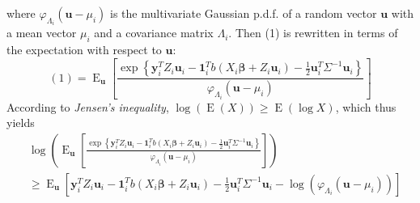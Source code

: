 \documentclass[11pt]{article}
\newcommand{\bs}{\boldsymbol}
\newcommand{\opn}{\operatorname}
\begin{document}
where $\varphi_{\Lambda_{i}} \left(\bs{u} - \mu_{i} \right)$ is the multivariate Gaussian p.d.f. of a random vector $\bs{u}$ with a mean vector $\mu_{i}$ and a covariance matrix $\Lambda_{i}$. Then (1) is rewritten in terms of the expectation with respect to $\bs{u}$:
$$
  (1) = \opn{E}_{\bs{u}} \left[\frac{\exp \left\{ \bs{y}_{i}^{T}Z_{i}\bs{u}_{i} - \bs{1}_{i}^{T}b\left(X_{i}\bs{\beta} + Z_{i}\bs{u}_{i} \right)-\frac{1}{2}\bs{u}_{i}^{T}\Sigma^{-1}\bs{u}_{i} \right\}}{\varphi_{\Lambda_{i}} \left(\bs{u} - \mu_{i} \right)} \right]
$$
According to \emph{Jensen's inequality},
$\log \left(\opn{E}\left(X \right) \right) \ge \opn{E}\left(\log X \right)$, which thus yields
\begin{align*}
  & \log \left(\opn{E}_{\bs{u}} \left[\frac{\exp \left\{ \bs{y}_{i}^{T}Z_{i}\bs{u}_{i} - \bs{1}_{i}^{T}b\left(X_{i}\bs{\beta} + Z_{i}\bs{u}_{i} \right)-\frac{1}{2}\bs{u}_{i}^{T}\Sigma^{-1}\bs{u}_{i} \right\}}{\varphi_{\Lambda_{i}} \left(\bs{u} - \mu_{i} \right)} \right]\right)\\
  & \ge \opn{E}_{\bs{u}} \left[\bs{y}_{i}^{T}Z_{i}\bs{u}_{i} - \bs{1}_{i}^{T}b\left(X_{i}\bs{\beta} + Z_{i}\bs{u}_{i} \right)-\frac{1}{2}\bs{u}_{i}^{T}\Sigma^{-1}\bs{u}_{i} - \log \left(\varphi_{\Lambda_{i}} \left(\bs{u} - \mu_{i} \right) \right) \right]
\end{align*}
\end{document}
